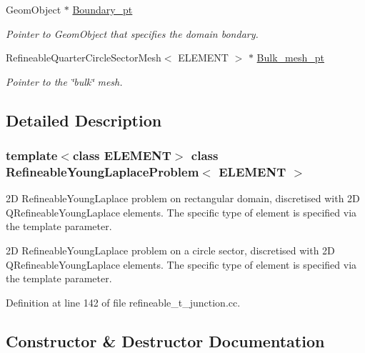 \begin{DoxyCompactItemize}
Geom\+Object $\ast$ \hyperlink{classRefineableYoungLaplaceProblem_a6092f98c7ffbcd158c783d372d375759}{Boundary\+\_\+pt}
\begin{DoxyCompactList}\small\item\em Pointer to Geom\+Object that specifies the domain bondary. \end{DoxyCompactList}\item 
Refineable\+Quarter\+Circle\+Sector\+Mesh$<$ E\+L\+E\+M\+E\+NT $>$ $\ast$ \hyperlink{classRefineableYoungLaplaceProblem_ab036ff8d3bf66d3f3bb9e977bc6822d3}{Bulk\+\_\+mesh\+\_\+pt}
\begin{DoxyCompactList}\small\item\em Pointer to the \char`\"{}bulk\char`\"{} mesh. \end{DoxyCompactList}\end{DoxyCompactItemize}


\subsection{Detailed Description}
\subsubsection*{template$<$class E\+L\+E\+M\+E\+NT$>$\newline
class Refineable\+Young\+Laplace\+Problem$<$ E\+L\+E\+M\+E\+N\+T $>$}

2D Refineable\+Young\+Laplace problem on rectangular domain, discretised with 2D Q\+Refineable\+Young\+Laplace elements. The specific type of element is specified via the template parameter.

2D Refineable\+Young\+Laplace problem on a circle sector, discretised with 2D Q\+Refineable\+Young\+Laplace elements. The specific type of element is specified via the template parameter. 

Definition at line 142 of file refineable\+\_\+t\+\_\+junction.\+cc.



\subsection{Constructor \& Destructor Documentation}
\mbox{\label{classRefineableYoungLaplaceProblem_a78f77a299f2770a82378fcccf86a0b71}} 
